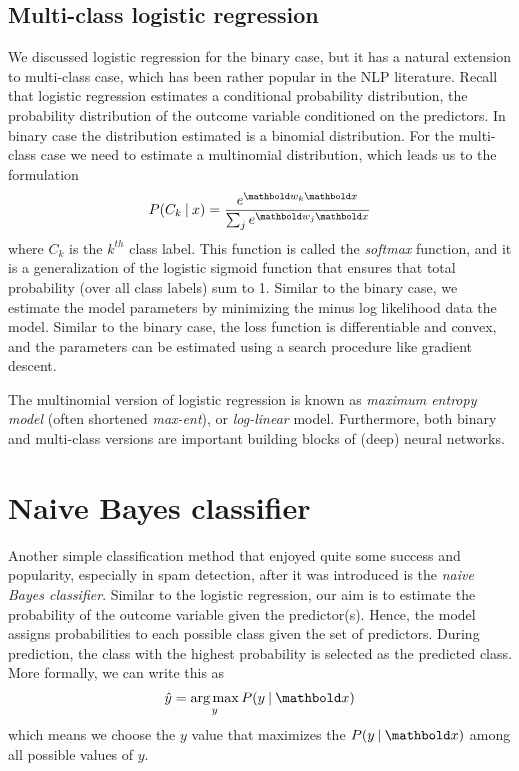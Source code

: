 \subsection{Multi-class logistic regression}

We discussed logistic regression for the binary case,
but it has a natural extension to multi-class case,
which has been rather popular in the NLP literature.
Recall that logistic regression estimates
a conditional probability distribution,
the probability distribution of the outcome variable
conditioned on the predictors.
In binary case the distribution estimated is a binomial distribution.
For the multi-class case we need to estimate a multinomial distribution,
which leads us to the formulation
\begin{equation*}
    P(C_{k}\given{}x) = \frac{e^{\vect{w}_{k}\vect{x}}}%
                      {\sum_{j} e^{\vect{w}_{j}\vect{x}}}
\end{equation*}
where $C_{k}$ is the $k^{th}$ class label.
This function is called the \emph{softmax} function,
and it is a generalization of the logistic sigmoid function
that ensures that total probability (over all class labels) sum to \num{1}.
Similar to the binary case,
we estimate the model parameters
by minimizing the minus log likelihood data the model.%
Similar to the binary case,
the loss function is differentiable and convex,
and the parameters can be estimated using a search procedure like gradient descent.

The multinomial version of logistic regression is known as 
\emph{maximum entropy model} (often shortened \emph{max-ent}),
or \emph{log-linear} model.
Furthermore, both binary and multi-class versions are
important building blocks of (deep) neural networks.


\section{Naive Bayes classifier}

Another simple classification method
that enjoyed quite some success and popularity,
especially in spam detection,
after it was introduced is the \emph{naive Bayes classifier}.
Similar to the logistic regression,
our aim is to estimate the probability of the outcome variable
given the predictor(s).
Hence, the model assigns probabilities to each possible class
given the set of predictors.
During prediction,
the class with the highest probability is selected as the predicted class.
More formally, we can write this as
\begin{equation*}
    \hat{y} = \argmax_{y} P(y\given\vect{x})
\end{equation*}
which means we choose the $y$ value
that maximizes the $P(y\given\vect{x})$ among all possible values of $y$.

